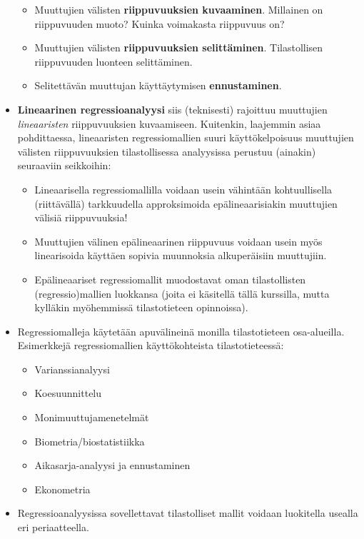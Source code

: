 \documentclass[
]{book}
\providecommand{\tightlist}{%
  \setlength{\itemsep}{0pt}\setlength{\parskip}{0pt}}
\begin{document}
\begin{itemize}
  \begin{itemize}
  \tightlist
  \item
    Muuttujien välisten \textbf{riippuvuuksien kuvaaminen}. Millainen on riippuvuuden muoto? Kuinka voimakasta riippuvuus on?
  \item
    Muuttujien välisten \textbf{riippuvuuksien selittäminen}. Tilastollisen riippuvuuden luonteen selittäminen.
  \item
    Selitettävän muuttujan käyttäytymisen \textbf{ennustaminen}.
  \end{itemize}
\item
  \textbf{Lineaarinen regressioanalyysi} siis (teknisesti) rajoittuu muuttujien \emph{lineaaristen} riippuvuuksien kuvaamiseen. Kuitenkin, laajemmin asiaa pohdittaessa, lineaaristen regressiomallien suuri käyttökelpoisuus muuttujien välisten riippuvuuksien tilastollisessa analyysissa perustuu (ainakin) seuraaviin seikkoihin:

  \begin{itemize}
  \tightlist
  \item
    Lineaarisella regressiomallilla voidaan usein vähintään kohtuullisella (riittävällä) tarkkuudella approksimoida epälineaarisiakin muuttujien välisiä riippuvuuksia!
  \item
    Muuttujien välinen epälineaarinen riippuvuus voidaan usein myös linearisoida käyttäen sopivia muunnoksia alkuperäisiin muuttujiin.
  \item
    Epälineaariset regressiomallit muodostavat oman tilastollisten (regressio)mallien luokkansa (joita ei käsitellä tällä kurssilla, mutta kylläkin myöhemmissä tilastotieteen opinnoissa).
  \end{itemize}
\item
  Regressiomalleja käytetään apuvälineinä monilla tilastotieteen osa-alueilla. Esimerkkejä regressiomallien käyttökohteista tilastotieteessä:

  \begin{itemize}
  \tightlist
  \item
    Varianssianalyysi
  \item
    Koesuunnittelu
  \item
    Monimuuttujamenetelmät
  \item
    Biometria/biostatistiikka
  \item
    Aikasarja-analyysi ja ennustaminen
  \item
    Ekonometria
  \end{itemize}
\item
  Regressioanalyysissa sovellettavat tilastolliset mallit voidaan luokitella usealla eri periaatteella.


\end{itemize}
\end{document}
